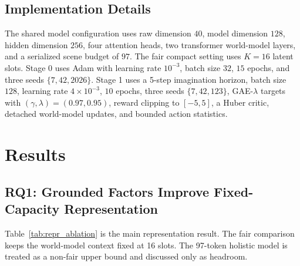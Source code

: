 \documentclass[journal]{IEEEtran}
\begin{document}
\subsection{Implementation Details}
The shared model configuration uses raw dimension $40$, model dimension $128$, hidden dimension $256$, four attention heads, two transformer world-model layers, and a serialized scene budget of $97$. The fair compact setting uses $K=16$ latent slots. Stage 0 uses Adam with learning rate $10^{-3}$, batch size $32$, $15$ epochs, and three seeds $\{7,42,2026\}$. Stage 1 uses a 5-step imagination horizon, batch size $128$, learning rate $4\times 10^{-3}$, $10$ epochs, three seeds $\{7,42,123\}$, GAE-$\lambda$ targets with $(\gamma,\lambda)=(0.97,0.95)$, reward clipping to $[-5,5]$, a Huber critic, detached world-model updates, and bounded action statistics.

\section{Results}
\subsection{RQ1: Grounded Factors Improve Fixed-Capacity Representation}
Table~\ref{tab:repr_ablation} is the main representation result. The fair comparison keeps the world-model context fixed at 16 slots. The 97-token holistic model is treated as a non-fair upper bound and discussed only as headroom.
\end{document}

